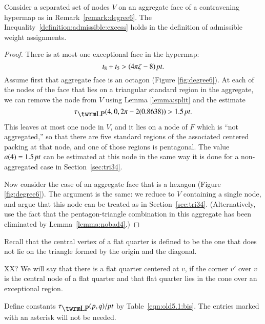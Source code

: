 \begin{lemma}
Consider a separated set of nodes $V$ on an aggregate face of a
contravening hypermap as in Remark~\ref{remark:degree6}.  The
Inequality~\ref{definition:admissible:excess} holds in the
definition of admissible weight assignments.
\end{lemma}

\begin{proof}
There is at most one exceptional face in the hypermap:
    $$t_8 + t_5 > (4\pi\zeta-8)\,\hbox{\it pt}.$$
Assume first that aggregate face is an octagon (Figure
\ref{fig:degree6}). At each of the nodes of the face that lies on a
triangular standard region in the aggregate, we can remove the node
from $V$ using Lemma \ref {lemma:split} and the estimate
    $$\tauLP(4,0,2\pi-2 (0.8638)) > 1.5\,\pt.$$
This leaves at most one node in $V$, and it lies on a node of $F$
which is ``not aggregated,'' so that there are five standard
regions of the associated centered packing at that node, and one
of those regions is pentagonal.  The value $a(4)=1.5\,\hbox{\it pt}$ can be
estimated at this node in the same way it is done for a
non-aggregated case in Section~\ref{sec:tri34}.

Now consider the case of an aggregate face that is a hexagon (Figure
\ref{fig:degree6}).  The argument is the same: we reduce to $V$
containing a single node, and argue that this node can be treated as
in Section~\ref{sec:tri34}.  (Alternatively, use the fact that the
pentagon-triangle combination in this aggregate has been eliminated
by Lemma~\ref{lemma:nobad4}.)
\end{proof}



Recall that the central vertex of a flat quarter is defined to be
the one that does not lie on the triangle formed by the origin and
the diagonal.
%


XX?  We will say that there is a flat quarter centered at $v$, if
the corner $v'$ over $v$ is the central node of a flat quarter and
that flat quarter lies in the cone over an exceptional region.




Define constants $\tlp(p,q)/\pt$ by Table~\ref{eqn:old5.1:bis}. The
entries marked with an asterisk will not be needed.
%

